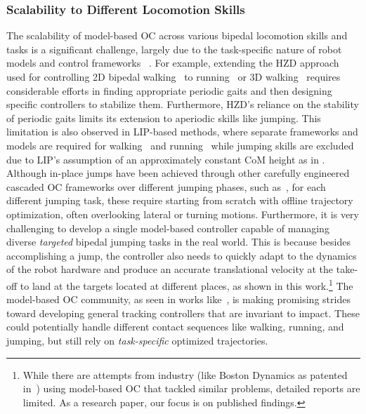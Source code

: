 \subsubsection{Scalability to Different Locomotion Skills}
The scalability of model-based OC across various bipedal locomotion skills and tasks is a significant challenge, largely due to the task-specific nature of robot models and control frameworks ~\cite{meduri2023biconmp}. 
For example, extending the HZD approach used for controlling 2D bipedal walking~\citep{sreenath2011compliant} to running~\citep{sreenath2013embedding} or 3D walking~\citep{da20162d} requires considerable efforts in finding appropriate periodic gaits and then designing specific controllers to stabilize them. Furthermore, HZD's reliance on the stability of periodic gaits limits its extension to aperiodic skills like jumping. 
This limitation is also observed in LIP-based methods, where separate frameworks and models are required for walking~\citep{takenaka2009realwalking} and running~\citep{takenaka2009realrunning} while jumping skills are excluded due to LIP's assumption of an approximately constant CoM height as in \cite{boroujeni2021unified}. 
Although in-place jumps have been achieved through other carefully engineered cascaded OC frameworks over different jumping phases, such as~\cite{xiong2018bipedal,kojima2019robot,qi2023vertical}, for each different jumping task, these require starting from scratch with offline trajectory optimization, often overlooking lateral or turning motions.
Furthermore, it is very challenging to develop a single model-based controller capable of managing diverse \emph{targeted} bipedal jumping tasks in the real world. This is because besides accomplishing a jump, the controller also needs to quickly adapt to the dynamics of the robot hardware and produce an accurate translational velocity at the take-off to land at the targets located at different places, as shown in this work.\footnote{While there are attempts from industry (like Boston Dynamics as patented in~\cite{deits2022robot}) using model-based OC that tackled similar problems, detailed reports are limited. As a research paper, our focus is on published findings.}
The model-based OC community, as seen in works like~\cite{yang2023impact}, is making promising strides toward developing general tracking controllers that are invariant to impact. 
These could potentially handle different contact sequences like walking, running, and jumping, but still rely on \emph{task-specific} optimized trajectories.



